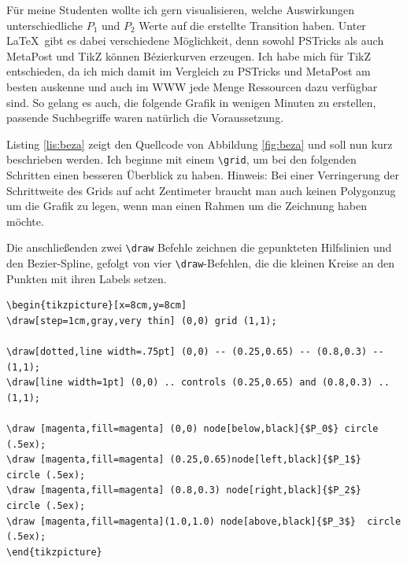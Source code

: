 \documentclass[ngerman]{dtk}%
\begin{document}
Für meine Studenten wollte ich gern visualisieren, welche Auswirkungen unterschiedliche $P_1$ und $P_2$ Werte auf die erstellte Transition haben. Unter \LaTeX\ gibt es dabei verschiedene Möglichkeit, denn sowohl PSTricks als auch MetaPost und TikZ können Bézierkurven erzeugen. Ich habe mich für TikZ entschieden, da ich mich damit im Vergleich zu PSTricks und MetaPost am besten auskenne 
und auch im WWW jede Menge Ressourcen dazu verfügbar sind. So gelang es auch, die folgende Grafik in wenigen Minuten zu erstellen, passende Suchbegriffe waren natürlich die Voraussetzung. 

Listing \ref{lis:beza} zeigt den Quellcode von Abbildung \ref{fig:beza} und soll nun kurz beschrieben werden. Ich beginne mit einem \verb|\grid|, um bei den folgenden Schritten einen besseren Überblick zu haben. Hinweis: Bei einer Verringerung der Schrittweite des Grids auf acht Zentimeter braucht man auch keinen Polygonzug um die Grafik zu legen, wenn man einen Rahmen um die Zeichnung haben möchte. 

Die anschließenden zwei \verb|\draw| Befehle zeichnen die gepunkteten Hilfslinien und den Bezier-Spline, gefolgt von vier \verb|\draw|-Befehlen, die die kleinen Kreise an den Punkten mit ihren Labels setzen. \clearpage

\begin{lstlisting}[language={[LaTeX]TeX},morekeywords={draw,controls,very,black,gray,thin,grid,magenta,dotted,left,right,above,line,width,%
and,tikzpicture,fill,node,below,step,circle},basicstyle=\ttfamily\footnotesize,caption={Quellcode für Abbildung \ref{fig:beza}},label={lis:beza}]
\begin{tikzpicture}[x=8cm,y=8cm]
\draw[step=1cm,gray,very thin] (0,0) grid (1,1);

\draw[dotted,line width=.75pt] (0,0) -- (0.25,0.65) -- (0.8,0.3) -- (1,1);  
\draw[line width=1pt] (0,0) .. controls (0.25,0.65) and (0.8,0.3) .. (1,1);

\draw [magenta,fill=magenta] (0,0) node[below,black]{$P_0$} circle (.5ex); 
\draw [magenta,fill=magenta] (0.25,0.65)node[left,black]{$P_1$}  circle (.5ex); 
\draw [magenta,fill=magenta] (0.8,0.3) node[right,black]{$P_2$}  circle (.5ex); 
\draw [magenta,fill=magenta](1.0,1.0) node[above,black]{$P_3$}  circle (.5ex); 
\end{tikzpicture}
\end{lstlisting}
\end{document}
